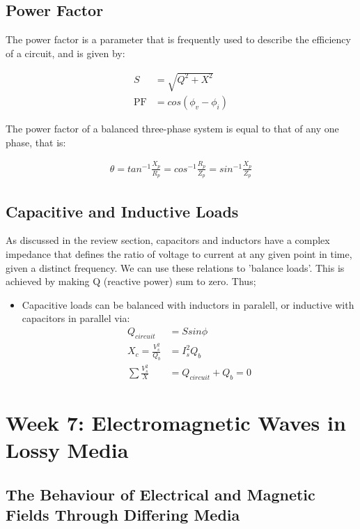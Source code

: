 \documentclass{book}
\begin{document}
\subsection{Power Factor}
The power factor is a parameter that is frequently used to describe the efficiency of a circuit, and is given by:

\begin{align*}
	S &= \sqrt{Q^2 + X^2} \\
	\text{PF} &= cos(\phi_v - \phi_i)
\end{align*}

The power factor of a balanced three-phase system is equal to that of any one phase, that is:

\begin{align*}
	\theta = tan^{-1} \frac{X_p}{R_p} = cos^{-1} \frac{R_p}{Z_p} = sin^{-1} \frac{X_p}{Z_p}
\end{align*}

\subsection{Capacitive and Inductive Loads}

As discussed in the review section, capacitors and inductors have a complex impedance that defines the ratio of voltage to current at any given point in time, given a distinct frequency. We can use these relations to 'balance loads'. This is achieved by making Q (reactive power) sum to zero. Thus;

\begin{itemize}
	\item Capacitive loads can be balanced with inductors in paralell, or inductive with capacitors in parallel via:
	\begin{align*}
		Q_{circuit} &= S sin \phi \\
		X_c = \frac{V_{s}^2}{Q_b} &= I_s^2 Q_b \\
		\sum \frac{V_s^2}{X} &= Q_{circuit} + Q_b =  0
	\end{align*}
\end{itemize}

\section{Week 7: Electromagnetic Waves in Lossy Media}

\subsection{The Behaviour of Electrical and Magnetic Fields Through Differing Media}
\end{document}
